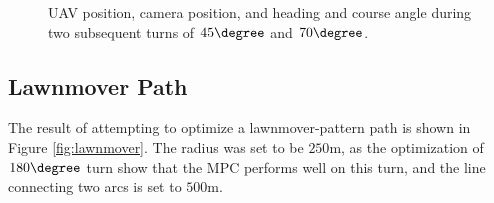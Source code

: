 \begin{figure}
	\caption{UAV position, camera position, and heading and course angle during two subsequent turns of $45\degree$ and $70\degree$.}
	\label{fig:paths_cur_150m}
\end{figure}


\subsection{Lawnmover Path}
\label{subsec:lawnmover}

The result of attempting to optimize a lawnmover-pattern path is shown in Figure \ref{fig:lawnmover}. The radius was set to be $250$m, as the optimization of $180\degree$ turn show that the MPC performs well on this turn, and the line connecting two arcs is set to $500$m.

